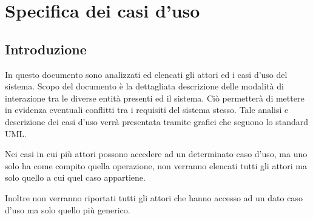 \chapter{Specifica dei casi d'uso}

\section{Introduzione}
In questo documento sono analizzati ed elencati gli attori ed i casi d'uso del sistema.
Scopo del documento è la dettagliata descrizione delle modalità di interazione tra le diverse entità presenti ed il sistema.
Ciò permetterà di mettere in evidenza eventuali conflitti tra i requisiti del sistema stesso.
Tale analisi e descrizione dei casi d'uso verrà presentata tramite grafici che seguono lo standard UML.

Nei casi in cui più attori possono accedere ad un determinato caso d’uso, ma uno
solo ha come compito quella operazione, non verranno elencati tutti gli attori
ma solo quello a cui quel caso appartiene.

Inoltre non verranno riportati tutti gli attori che hanno accesso ad un dato caso d'uso ma solo quello più generico.



